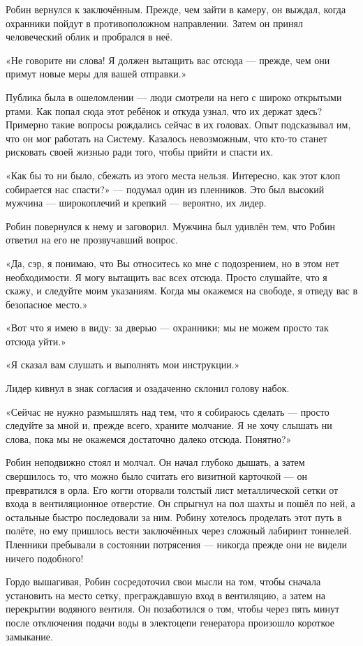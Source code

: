\documentclass[a5paper, 9pt,
final, openany, twoside=true]{memoir}
\begin{document}
Робин вернулся к заключённым. Прежде, чем зайти в камеру, он выждал, когда охранники пойдут в противоположном направлении. Затем он принял человеческий облик и пробрался в неё.

«Не говорите ни слова! Я должен вытащить вас отсюда — прежде, чем они примут новые меры для вашей отправки.»

Публика была в ошеломлении — люди смотрели на него с широко открытыми ртами. Как попал сюда этот ребёнок и откуда узнал, что их держат здесь? Примерно такие вопросы рождались сейчас в их головах. Опыт подсказывал им, что он мог работать на Систему. Казалось невозможным, что кто-то станет рисковать своей жизнью ради того, чтобы прийти и спасти их.

«Как бы то ни было, сбежать из этого места нельзя. Интересно, как этот клоп собирается нас спасти?» — подумал один из пленников. Это был высокий мужчина — широкоплечий и крепкий — вероятно, их лидер.

Робин повернулся к нему и заговорил. Мужчина был удивлён тем, что Робин ответил на его не прозвучавший вопрос.

«Да, сэр, я понимаю, что Вы относитесь ко мне с подозрением, но в этом нет необходимости. Я могу вытащить вас всех отсюда. Просто слушайте, что я скажу, и следуйте моим указаниям. Когда мы окажемся на свободе, я отведу вас в безопасное место.»

«Вот что я имею в виду: за дверью — охранники; мы не можем просто так отсюда уйти.»

«Я сказал вам слушать и выполнять мои инструкции.»

Лидер кивнул в знак согласия и озадаченно склонил голову набок.

«Сейчас не нужно размышлять над тем, что я собираюсь сделать — просто следуйте за мной и, прежде всего, храните молчание. Я не хочу слышать ни слова, пока мы не окажемся достаточно далеко отсюда. Понятно?»\bigskip

Робин неподвижно стоял и молчал. Он начал глубоко дышать, а затем свершилось то, что можно было считать его визитной карточкой — он превратился в орла. Его когти оторвали толстый лист металлической сетки от входа в вентиляционное отверстие. Он спрыгнул на пол шахты и пошёл по ней, а остальные быстро последовали за ним. Робину хотелось проделать этот путь в полёте, но ему пришлось вести заключённых через сложный лабиринт тоннелей. Пленники пребывали в состоянии потрясения — никогда прежде они не видели ничего подобного!

Гордо вышагивая, Робин сосредоточил свои мысли на том, чтобы сначала установить на место сетку, преграждавшую вход в вентиляцию, а затем на перекрытии водяного вентиля. Он позаботился о том, чтобы через пять минут после отключения подачи воды в электоцепи генератора произошло короткое замыкание.
\end{document}
